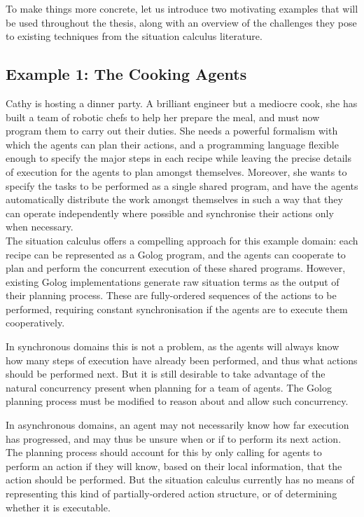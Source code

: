 To make things more concrete, let us introduce two motivating examples
that will be used throughout the thesis, along with an overview of
the challenges they pose to existing techniques from the situation
calculus literature.


\subsection*{Example 1: The Cooking Agents}

Cathy is hosting a dinner party. A brilliant engineer but a mediocre
cook, she has built a team of robotic chefs to help her prepare the
meal, and must now program them to carry out their duties. She needs
a powerful formalism with which the agents can plan their actions,
and a programming language flexible enough to specify the major steps
in each recipe while leaving the precise details of execution for
the agents to plan amongst themselves. Moreover, she wants to specify
the tasks to be performed as a single shared program, and have the
agents automatically distribute the work amongst themselves in such
a way that they can operate independently where possible and synchronise
their actions only when necessary.\\


The situation calculus offers a compelling approach for this example
domain: each recipe can be represented as a Golog program, and the
agents can cooperate to plan and perform the concurrent execution
of these shared programs. However, existing Golog implementations
generate raw situation terms as the output of their planning process.
These are fully-ordered sequences of the actions to be performed,
requiring constant synchronisation if the agents are to execute them
cooperatively.

In synchronous domains this is not a problem, as the agents will always
know how many steps of execution have already been performed, and
thus what actions should be performed next. But it is still desirable
to take advantage of the natural concurrency present when planning
for a team of agents. The Golog planning process must be modified
to reason about and allow such concurrency.

In asynchronous domains, an agent may not necessarily know how far
execution has progressed, and may thus be unsure when or if to perform
its next action. The planning process should account for this by only
calling for agents to perform an action if they will know, based on
their local information, that the action should be performed. But
the situation calculus currently has no means of representing this
kind of partially-ordered action structure, or of determining whether
it is executable.

